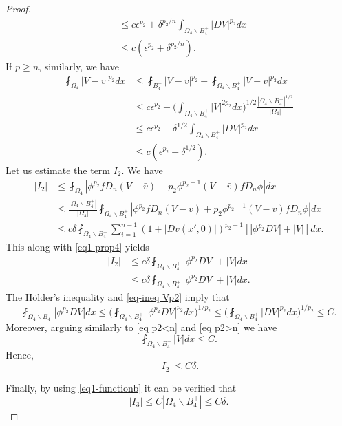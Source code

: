 \documentclass[a4paper,10pt]{amsart}
\newcommand{\f}{\frac}
\newcommand{\Om}{\Omega}
\begin{document}
\begin{proof}
\begin{equation}
\begin{aligned}
&\leq c\epsilon^{p_2}+ \delta^{p_2/n}\int_{\Om_{4 }\backslash B_4^+}|DV|^{p_2}dx\\
&\leq c(\epsilon^{p_2}+\delta^{p_2/n}).
\end{aligned}
\end{equation}
If $p\geq n$, similarly, we have
\begin{equation}\label{eq p2>n}
\begin{aligned}
\fint_{\Om_{4 }}|V-\bar{v}|^{p_2}dx&\leq \fint_{B_4^+}|V-v|^{p_2}+\fint_{\Om_{4 }\backslash B_4^+}|V-\bar{v}|^{p_2}dx\\
&\leq c\epsilon^{p_2}+ \Big( \int_{\Om_{4 }\backslash B_4^+}|V|^{2p_2}dx\Big)^{1/2}\f{|\Om_{4 }\backslash B_4^+|^{1/2}}{|\Om_{4 }|}\\
&\leq c\epsilon^{p_2}+ \delta^{1/2}\int_{\Om_{4 }\backslash B_4^+}|DV|^{p_2}dx\\
&\leq c(\epsilon^{p_2}+\delta^{1/2}).
\end{aligned}
\end{equation}
Let us estimate the term $I_2$. We have
$$
\begin{aligned}
|I_2|&\leq \fint_{\Om_{4}} |\phi^{p_2}f D_n (V-\bar{v})+p_2\phi^{p_2-1} (V-\bar{v})f D_n\phi|  dx\\
&\leq \f{|\Om_{4}\backslash B_4^+|}{|\Om_{4}|}\fint_{\Om_{4}\backslash B_4^+} |\phi^{p_2}f D_n (V-\bar{v})+p_2\phi^{p_2-1} (V-\bar{v})f D_n\phi|  dx\\
&\leq c\delta\fint_{\Om_{4}\backslash B_4^+} \sum_{i=1}^{n-1}(1+ |Dv(x',0)|)^{p_2-1}\left[|\phi^{p_2}DV|+| V | \right] dx.
\end{aligned}
$$	
This along with \eqref{eq1-prop4} yields
$$
\begin{aligned}
|I_2|
&\leq c\delta\fint_{\Om_{4}\backslash B_4^+}|\phi^{p_2}DV|+| V | dx\\
&\leq c\delta\fint_{\Om_{4}\backslash B_4^+}|\phi^{p_2}DV|+| V | dx.
\end{aligned}
$$
The  H\"older's inequality and \eqref{eq-ineq Vp2} imply that
$$
\fint_{\Om_{4}\backslash B_4^+}|\phi^{p_2}DV|dx\leq \Big(\fint_{\Om_{4}\backslash B_4^+}|\phi^{p_2}DV|^{p_2}dx\Big)^{1/p_2}\leq \Big(\fint_{\Om_{4}\backslash B_4^+}|DV|^{p_2}dx\Big)^{1/p_2}\leq C.
$$
Moreover, arguing similarly to \eqref{eq p2<n} and \eqref{eq p2>n} we have
$$
\fint_{\Om_{4}\backslash B_4^+}| V | dx\leq C.
$$ 
Hence,
$$
|I_2|\leq C\delta.
$$

Finally, by using \eqref{eq1-functionb} it can be verified that
$$
|I_3|\leq C|\Om_{4}\backslash B_4^+|\leq C\delta.
$$


\end{proof}
\end{document}
